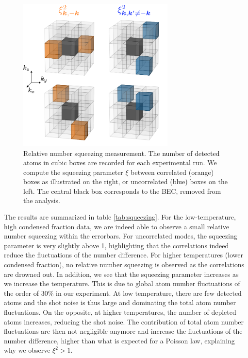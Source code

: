 \begin{figure}
    \centering
    \includegraphics[width=0.7\textwidth]{Fig/Chapter4/squeezing.png}
    \caption{Relative number squeezing measurement. The number of detected atoms in cubic boxes are recorded for each experimental run. We compute the squeezing parameter $\xi$ between correlated (orange) boxes as illustrated on the right, or uncorrelated (blue) boxes on the left. The central black box corresponds to the BEC, removed from the analysis.}
    \label{fig:squeezing}
\end{figure}

The results are summarized in table \ref{tab:squeezing}. For the low-temperature, high condensed fraction data, we are indeed able to observe a small relative number squeezing within the errorbars. For uncorrelated modes, the squeezing parameter is very slightly above 1, highlighting that the correlations indeed reduce the fluctuations of the number difference. For higher temperatures (lower condensed fraction), no relative number squeezing is observed as the correlations are drowned out. In addition, we see that the squeezing parameter increases as we increase the temperature. This is due to global atom number fluctuations of the order of $30\%$ in our experiment. At low temperature, there are few detected atoms and the shot noise is thus large and dominating the total atom number fluctuations. On the opposite, at higher temperatures, the number of depleted atoms increases, reducing the shot noise. The contribution of total atom number fluctuations are then not negligible anymore and increase the fluctuations of the number difference, higher than what is expected for a Poisson law, explaining why we observe $\xi^2 > 1$.

